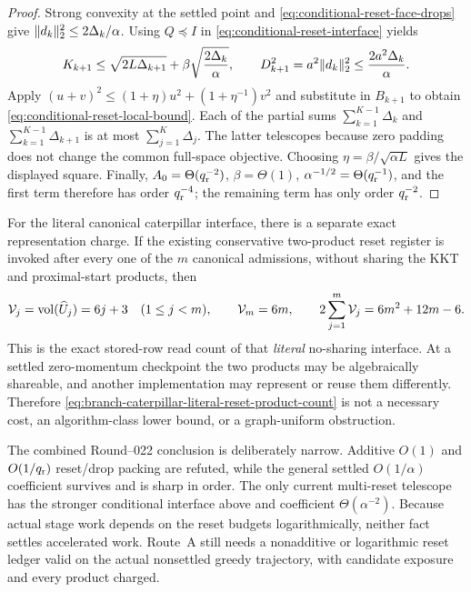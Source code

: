 \begin{proof}
Strong convexity at the settled point and
\cref{eq:conditional-reset-face-drops} give
$\lVert d_k\rVert_2^2\leq2\Delta_k/\alpha$.  Using
$Q\preceq I$ in \cref{eq:conditional-reset-interface} yields
\begin{equation*}
 K_{k+1}\leq\sqrt{2L\Delta_{k+1}}
  +\beta\sqrt{\frac{2\Delta_k}{\alpha}},
 \qquad
 D_{k+1}^2=a^2\lVert d_k\rVert_2^2
 \leq\frac{2a^2\Delta_k}{\alpha}.
\end{equation*}
Apply
$(u+v)^2\leq(1+\eta)u^2+(1+\eta^{-1})v^2$ and substitute in $B_{k+1}$ to
obtain \cref{eq:conditional-reset-local-bound}.  Each of the partial sums
$\sum_{k=1}^{K-1}\Delta_k$ and
$\sum_{k=1}^{K-1}\Delta_{k+1}$ is at most
$\sum_{j=1}^{K}\Delta_j$.  The latter telescopes because zero padding does
not change the common full-space objective.  Choosing
$\eta=\beta/\sqrt{\alpha L}$ gives the displayed square.  Finally,
$A_0=\Theta(q_{\rm r}^{-2})$, $\beta=\Theta(1)$,
$\alpha^{-1/2}=\Theta(q_{\rm r}^{-1})$, and the first term therefore has
order $q_{\rm r}^{-4}$; the remaining term has only order
$q_{\rm r}^{-2}$.
\end{proof}

For the literal canonical caterpillar interface, there is a separate exact
representation charge.  If the existing conservative two-product reset
register is invoked after every one of the $m$ canonical admissions, without
sharing the KKT and proximal-start products, then
\begin{equation}
 \mathcal V_j=\operatorname{vol}(\widehat U_j)=6j+3\quad(1\leq j<m),
 \qquad \mathcal V_m=6m,
 \qquad
 2\sum_{j=1}^{m}\mathcal V_j=6m^2+12m-6.
 \label{eq:branch-caterpillar-literal-reset-product-count}
\end{equation}
This is the exact stored-row read count of that \emph{literal} no-sharing
interface.  At a settled zero-momentum checkpoint the two products may be
algebraically shareable, and another implementation may represent or reuse
them differently.  Therefore
\cref{eq:branch-caterpillar-literal-reset-product-count} is not a necessary
cost, an algorithm-class lower bound, or a graph-uniform obstruction.

The combined Round--022 conclusion is deliberately narrow.  Additive
$O(1)$ and $O(1/q_{\rm r})$ reset/drop packing are refuted, while the general
settled $O(1/\alpha)$ coefficient survives and is sharp in order.  The only
current multi-reset telescope has the stronger conditional interface above
and coefficient $\Theta(\alpha^{-2})$.  Because actual stage work depends on
the reset budgets logarithmically, neither fact settles accelerated work.
Route~A still needs a nonadditive or logarithmic reset ledger valid on the
actual nonsettled greedy trajectory, with candidate exposure and every
product charged.
